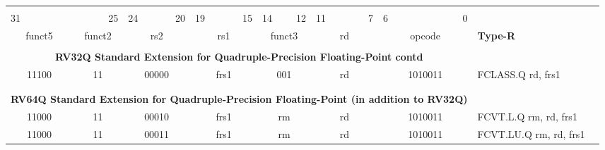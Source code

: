 \documentclass{report}
\begin{document}
\begin{table}[p]
\begin{small}
\begin{center}
\begin{tabular}{p{0.05mm}p{0.05mm}p{0.05mm}p{0.05mm}p{0.05mm}p{0.05mm}p{0.05mm}p{0.05mm}p{0.05mm}p{0.05mm}p{0.05mm}p{0.05mm}p{0.05mm}p{0.05mm}p{0.05mm}p{0.05mm}p{0.05mm}p{0.05mm}p{0.05mm}p{0.05mm}p{0.05mm}p{0.05mm}p{0.05mm}p{0.05mm}p{0.05mm}p{0.05mm}p{0.05mm}p{0.05mm}p{0.05mm}p{0.05mm}p{0.05mm}p{0.05mm}p{50mm}l}& & & & & & & & & & & & & & & & & & & & & & & & & & & & & & & & & \\
\multicolumn{3}{l}{\scriptsize{31}} & \multicolumn{4}{r}{\scriptsize{25}} & \multicolumn{2}{l}{\scriptsize{24}} & \multicolumn{3}{r}{\scriptsize{20}} & \multicolumn{2}{l}{\scriptsize{19}} & \multicolumn{3}{r}{\scriptsize{15}} & \multicolumn{1}{l}{\scriptsize{14}} & \multicolumn{2}{r}{\scriptsize{12}} & \multicolumn{2}{l}{\scriptsize{11}} & \multicolumn{3}{r}{\scriptsize{7}} & \multicolumn{3}{l}{\scriptsize{6}} & \multicolumn{4}{r}{\scriptsize{0}} &  \\
\cline{1-32}
\multicolumn{5}{|c|}{funct5} & \multicolumn{2}{c|}{funct2} & \multicolumn{5}{c|}{rs2} & \multicolumn{5}{c|}{rs1} & \multicolumn{3}{c|}{funct3} & \multicolumn{5}{c|}{rd} & \multicolumn{7}{c|}{opcode} & \scriptsize{\bf Type-R} \\
\cline{1-32}
\tabularnewline
\multicolumn{32}{c}{\bf RV32Q Standard Extension for Quadruple-Precision Floating-Point  contd} & \\
\cline{1-32}
\cline{1-32}
\multicolumn{5}{|c|}{11100} & \multicolumn{2}{c|}{11} & \multicolumn{5}{c|}{00000} & \multicolumn{5}{c|}{frs1} & \multicolumn{3}{c|}{001} & \multicolumn{5}{c|}{rd} & \multicolumn{7}{c|}{1010011} & \scriptsize{FCLASS.Q rd, frs1} \\
\cline{1-32}
\tabularnewline
\tabularnewline
\multicolumn{32}{c}{\bf RV64Q Standard Extension for Quadruple-Precision Floating-Point (in addition to RV32Q) } & \\
\cline{1-32}
\multicolumn{5}{|c|}{11000} & \multicolumn{2}{c|}{11} & \multicolumn{5}{c|}{00010} & \multicolumn{5}{c|}{frs1} & \multicolumn{3}{c|}{rm} & \multicolumn{5}{c|}{rd} & \multicolumn{7}{c|}{1010011} & \scriptsize{FCVT.L.Q rm, rd, frs1} \\
\cline{1-32}
\multicolumn{5}{|c|}{11000} & \multicolumn{2}{c|}{11} & \multicolumn{5}{c|}{00011} & \multicolumn{5}{c|}{frs1} & \multicolumn{3}{c|}{rm} & \multicolumn{5}{c|}{rd} & \multicolumn{7}{c|}{1010011} & \scriptsize{FCVT.LU.Q rm, rd, frs1} \\

\end{tabular}
\end{center}
\end{small}
\end{table}
\end{document}

